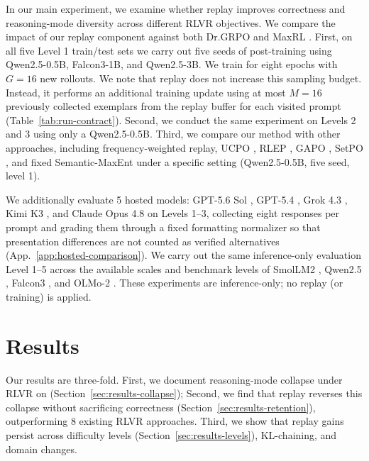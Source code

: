 In our main experiment, we examine whether replay improves correctness and reasoning-mode diversity across different RLVR objectives. 
We compare the impact of our replay component against both Dr.GRPO \citep{liu2025understanding} and MaxRL \citep{tajwar2026maxrl}. 
First, on all five \mb{} Level 1 train/test sets we carry out five seeds of post-training using Qwen2.5-0.5B, Falcon3-1B, and Qwen2.5-3B. We train for eight epochs with $G=16$ new rollouts. 
We note that replay does not increase this sampling budget. Instead, it performs an additional training update using at most $M=16$ previously collected exemplars from the replay buffer for each visited prompt (Table~\ref{tab:run-contract}).
Second, we conduct the same experiment on \mb{} Levels 2 and 3 using only a Qwen2.5-0.5B. 
Third, we compare our method with other approaches, including frequency-weighted replay, UCPO \citep{lochab2026ucpo}, RLEP \citep{zhang2025rlep}, GAPO \citep{anschel2025groupaware}, SetPO \citep{li2026setpo}, and fixed Semantic-MaxEnt under a specific setting (Qwen2.5-0.5B, five seed, level 1).


We additionally evaluate 5 hosted models: GPT-5.6 Sol \citep{openai2026gpt56}, GPT-5.4 \citep{openai2026gpt54}, Grok 4.3 \citep{xai2026grok43}, Kimi K3 \citep{kimiteam2026kimik3}, and Claude Opus 4.8 \citep{anthropic2026opus48} on \mb{} Levels 1--3, collecting eight responses per prompt and grading them through a fixed formatting normalizer so that presentation differences are not counted as verified alternatives (App.~\ref{app:hosted-comparison}). We carry out the same inference-only evaluation Level 1--5 across the available scales and benchmark levels of SmolLM2 \citep{allal2025smollm2},
Qwen2.5 \citep{yang2024qwen25}, Falcon3 \citep{falconllm2024falcon3}, and OLMo-2 \citep{olmo20242olmo2furious}. These experiments are inference-only; no replay (or training) is applied.

\section{Results}
\label{sec:results}

Our results are three-fold.  First, we document reasoning-mode collapse under RLVR on \mb{} (Section~\ref{sec:results-collapse});
Second, we find that replay reverses this collapse without sacrificing correctness (Section~\ref{sec:results-retention}), outperforming 8 existing RLVR approaches.
Third, we show that replay gains persist across difficulty levels (Section~\ref{sec:results-levels}), KL-chaining, and domain changes.

